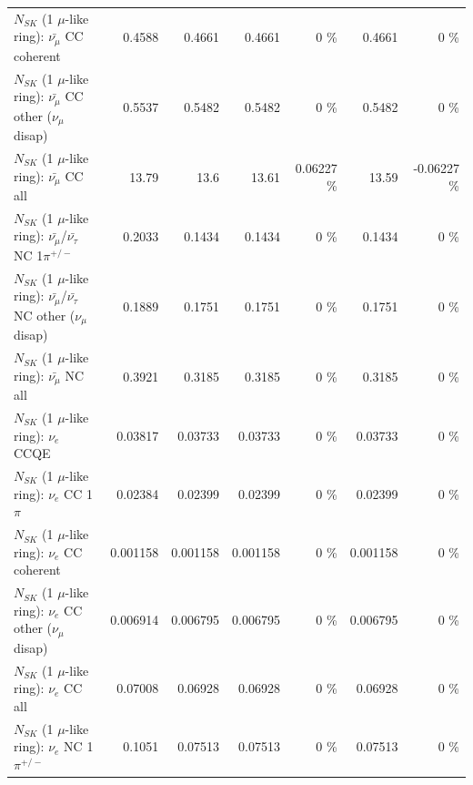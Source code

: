 \begin{table}
\begin{tabular}{| l | r | r | r  r | r  r |}
                       $N_{SK}$ (1 $\mu$-like ring): $\bar{\nu_\mu}$ CC coherent &          0.4588 &          0.4661 &          0.4661 &        0 \%  &          0.4661 &        0 \%  \\ 
        $N_{SK}$ (1 $\mu$-like ring): $\bar{\nu_\mu}$ CC other ($\nu_\mu$ disap) &          0.5537 &          0.5482 &          0.5482 &        0 \%  &          0.5482 &        0 \%  \\ 
                          $N_{SK}$ (1 $\mu$-like ring): $\bar{\nu_{\mu}}$ CC all &           13.79 &            13.6 &           13.61 &  0.06227 \%  &           13.59 & -0.06227 \%  \\ 
\hline
  $N_{SK}$ (1 $\mu$-like ring): $\bar{\nu_\mu}$/$\bar{\nu_\tau}$ NC 1$\pi^{+/-}$ &          0.2033 &          0.1434 &          0.1434 &        0 \%  &          0.1434 &        0 \%  \\ 
$N_{SK}$ (1 $\mu$-like ring): $\bar{\nu_\mu}$/$\bar{\nu_\tau}$ NC other ($\nu_\mu$ disap) &          0.1889 &          0.1751 &          0.1751 &        0 \%  &          0.1751 &        0 \%  \\ 
                          $N_{SK}$ (1 $\mu$-like ring): $\bar{\nu_{\mu}}$ NC all &          0.3921 &          0.3185 &          0.3185 &        0 \%  &          0.3185 &        0 \%  \\ 
\hline
\hline
\hline
                                      $N_{SK}$ (1 $\mu$-like ring): $\nu_e$ CCQE &         0.03817 &         0.03733 &         0.03733 &        0 \%  &         0.03733 &        0 \%  \\ 
                                 $N_{SK}$ (1 $\mu$-like ring): $\nu_e$ CC 1$\pi$ &         0.02384 &         0.02399 &         0.02399 &        0 \%  &         0.02399 &        0 \%  \\ 
                               $N_{SK}$ (1 $\mu$-like ring): $\nu_e$ CC coherent &        0.001158 &        0.001158 &        0.001158 &        0 \%  &        0.001158 &        0 \%  \\ 
                $N_{SK}$ (1 $\mu$-like ring): $\nu_e$ CC other ($\nu_\mu$ disap) &        0.006914 &        0.006795 &        0.006795 &        0 \%  &        0.006795 &        0 \%  \\ 
                                  $N_{SK}$ (1 $\mu$-like ring): $\nu_{e}$ CC all &         0.07008 &         0.06928 &         0.06928 &        0 \%  &         0.06928 &        0 \%  \\ 
\hline
                           $N_{SK}$ (1 $\mu$-like ring): $\nu_e$ NC 1$\pi^{+/-}$ &          0.1051 &         0.07513 &         0.07513 &        0 \%  &         0.07513 &        0 \%  \\ 

\end{tabular}
\end{table}
